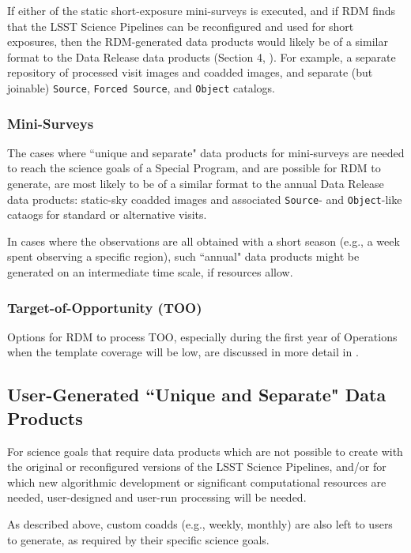 If either of the static short-exposure mini-surveys is executed, and if 
RDM finds that the LSST Science Pipelines can be reconfigured and used 
for short exposures, then the RDM-generated data products would likely be 
of a similar format to the Data Release data products 
(Section 4, ).
For example, a separate repository of processed visit images and coadded 
images, and separate (but joinable) {\tt Source}, {\tt Forced Source}, and 
{\tt Object} catalogs.


\subsubsection{Mini-Surveys}

The cases where ``unique and separate" data products for mini-surveys are 
needed to reach the science goals of a Special Program, and are possible for 
RDM to generate, are most likely to be of a similar format to the annual 
Data Release data products: static-sky coadded images and associated 
{\tt Source}- and {\tt Object}-like cataogs for standard or alternative visits.

In cases where the observations are all obtained with a short season 
(e.g., a week spent observing a specific region), such ``annual" 
data products might be generated on an intermediate time scale, 
if resources allow.


\subsubsection{Target-of-Opportunity (TOO)}

Options for RDM to process TOO, especially during the first year of Operations 
when the template coverage will be low, are discussed in more detail in 
.


\subsection{User-Generated ``Unique and Separate" Data Products}\label{ssec:proc_user}

For science goals that require data products which are not possible to create with 
the original or reconfigured versions of the 
LSST Science Pipelines, and/or for which new algorithmic development or significant 
computational resources are needed, 
user-designed and user-run processing will be needed.

As described above, custom coadds (e.g., weekly, monthly) are also left to users 
to generate, as required by their specific science goals.

